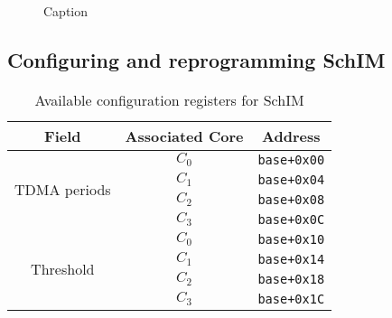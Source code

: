         \begin{figure}
            \centering
            
            \caption{Caption}
            \label{fig:SchIM_transaction_scheme_figure}
        \end{figure}
        
    \subsection{Configuring and reprogramming SchIM}
        \begin{table}[!ht]
            \centering
            \caption{Available configuration registers for SchIM}
            \label{tab:configuration_port_structure}
            \begin{tabular}{|c||c|c|}
                \hline
                \multicolumn{1}{|c||}{Field}               & \multicolumn{1}{c|}{Associated Core}      & \multicolumn{1}{c|}{Address}        \\ \hline\hline
                \multirow{4}{*}{TDMA periods}             & $C_{0}$                                   & \verb|base+0x00|                    \\ \cline{2-3} 
                                                          & $C_{1}$                                   & \verb|base+0x04|                    \\ \cline{2-3} 
                                                          & $C_{2}$                                   & \verb|base+0x08|                    \\ \cline{2-3} 
                                                          & $C_{3}$                                   & \verb|base+0x0C|                    \\ \hline
                \multirow{4}{*}{Threshold}                & $C_{0}$                                   & \verb|base+0x10|                    \\ \cline{2-3} 
                                                          & $C_{1}$                                   & \verb|base+0x14|                    \\ \cline{2-3} 
                                                          & $C_{2}$                                   & \verb|base+0x18|                    \\ \cline{2-3} 
                                                          & $C_{3}$                                   & \verb|base+0x1C|                    \\ \hline

\end{tabular}
\end{table}
